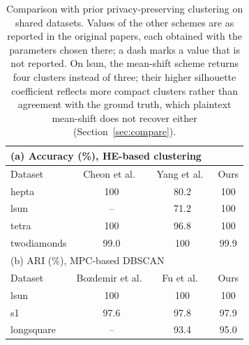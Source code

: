\begin{table}[t]
\centering
\caption{Comparison with prior privacy-preserving clustering on shared
  datasets. Values of the other schemes are as reported in the original
  papers, each obtained with the parameters chosen there; a dash marks a
  value that is not reported. On lsun, the mean-shift scheme returns four
  clusters instead of three; their higher silhouette coefficient reflects
  more compact clusters rather than agreement with the ground truth, which
  plaintext mean-shift does not recover either
  (Section~\ref{sec:compare}).}
\label{tab:compare}
\begin{tabular}{lccc}
\toprule
\multicolumn{4}{l}{(a) Accuracy (\%), HE-based clustering} \\
\midrule
Dataset & Cheon et al.~\cite{cheon2019towards}
  & Yang et al.~\cite{yang2024optimized} & Ours \\
\midrule
hepta        & 100  & 80.2  & 100 \\
lsun         & --   & 71.2  & 100 \\
tetra        & 100  & 96.8  & 100 \\
twodiamonds  & 99.0 & 100   & 99.9 \\
\midrule
\multicolumn{4}{l}{(b) ARI (\%), MPC-based DBSCAN} \\
\midrule
Dataset & Bozdemir et al.~\cite{bozdemir2021privacy}
  & Fu et al.~\cite{fu2024ppa} & Ours \\
\midrule
lsun         & 100  & 100   & 100 \\
s1           & 97.6 & 97.8  & 97.9 \\
longsquare   & --   & 93.4  & 95.0 \\
\bottomrule
\end{tabular}
\end{table}


